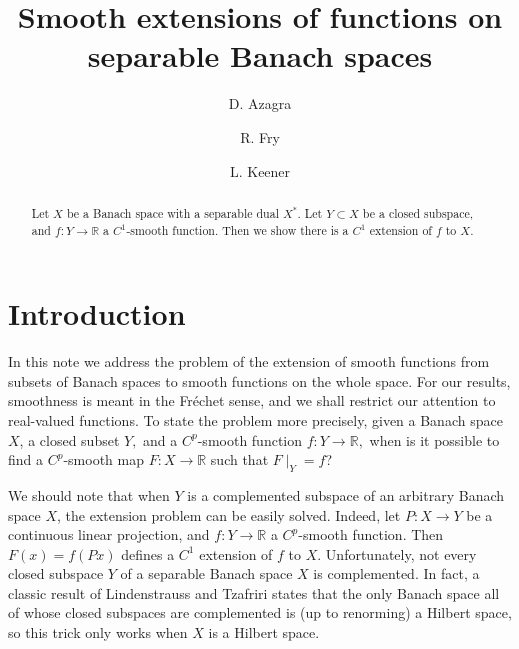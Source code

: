 \documentclass[11pt]{amsproc}%
\theoremstyle{plain}
\numberwithin{equation}{section}
\begin{document}
\title[Smooth extensions]{Smooth extensions of functions on separable Banach spaces}
\author{}
\author{D. Azagra}
\address{ICMAT (CSIC-UAM-UC3-UCM), Departamento de An{\'a}lisis Matem{\'a}tico,
Facultad Ciencias Matem{\'a}ticas, Universidad Complutense, 28040, Madrid, Spain}
\author{R. Fry}
\address{Department of Mathematics and Statistics, Thompson Rivers University,
Kamloops, B.C., Canada}
\author{L. Keener}
\address{Department of Mathematics and Statistics, University of Northern British
Columbia, Prince Georege, B.C., Canada}

\begin{abstract}
Let $X$ be a Banach space with a separable dual $X^{*}$. Let $Y\subset X$ be a
closed subspace, and $f:Y\rightarrow\mathbb{R}$ a $C^{1}$-smooth function.
Then we show there is a $C^{1}$ extension of $f$ to $X$.

\end{abstract}
\maketitle


\section{Introduction}

In this note we address the problem of the extension of smooth functions from
subsets of Banach spaces to smooth functions on the whole space. For our
results, smoothness is meant in the Fr{\'e}chet sense, and we shall restrict
our attention to real-valued functions. To state the problem more precisely,
given a Banach space $X$, a closed subset $Y,$ and a $C^{p}$-smooth function
$f:Y\rightarrow\mathbb{R},$ when is it possible to find a $C^{p}$-smooth map
$F:X\rightarrow\mathbb{R}$ such that $F\mid_{Y}=f$?

We should note that when $Y$ is a complemented subspace of an arbitrary Banach
space $X$, the extension problem can be easily solved. Indeed, let
$P:X\rightarrow Y$ be a continuous linear projection, and $f:Y\rightarrow
\mathbb{R}$ a $C^{p}$-smooth function. Then $F\left(  x\right)  =f\left(
Px\right)  $ defines a $C^{1}$ extension of $f$ to $X$. Unfortunately, not
every closed subspace $Y$ of a separable Banach space $X$ is complemented. In
fact, a classic result of Lindenstrauss and Tzafriri \cite{LT} states that the
only Banach space all of whose closed subspaces are complemented is (up to
renorming) a Hilbert space, so this trick only works when $X$ is a Hilbert space.
\end{document}
